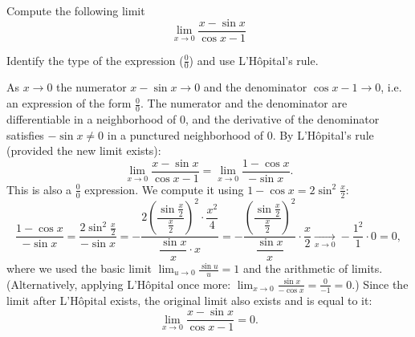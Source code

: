 
\begin{question}
Compute the following limit
\[ \lim_{x\to 0} \frac{x - \sin x}{\cos x - 1} \]
\end{question}

\begin{hint}
Identify the type of the expression ($\frac{0}{0}$) and use L'Hôpital's rule.
\end{hint}

\begin{solution}
As $x \to 0$ the numerator $x - \sin x \to 0$ and the denominator $\cos x - 1 \to 0$, i.e. an expression of the form $\frac{0}{0}$.
The numerator and the denominator are differentiable in a neighborhood of $0$, and the derivative of the denominator satisfies $-\sin x \ne 0$ in a punctured neighborhood of $0$. By L'Hôpital's rule (provided the new limit exists):
\[ \lim_{x\to 0} \frac{x - \sin x}{\cos x - 1} = \lim_{x\to 0} \frac{1 - \cos x}{-\sin x}. \]
This is also a $\frac{0}{0}$ expression. We compute it using $1 - \cos x = 2\sin^2\frac{x}{2}$:
\[ \frac{1 - \cos x}{-\sin x} = \frac{2\sin^2\frac{x}{2}}{-\sin x}
   = -\frac{2\left(\dfrac{\sin\frac{x}{2}}{\frac{x}{2}}\right)^2 \cdot \dfrac{x^2}{4}}{\dfrac{\sin x}{x} \cdot x}
   = -\frac{\left(\dfrac{\sin\frac{x}{2}}{\frac{x}{2}}\right)^2}{\dfrac{\sin x}{x}} \cdot \frac{x}{2}
   \xrightarrow[x\to 0]{} -\frac{1^2}{1}\cdot 0 = 0, \]
where we used the basic limit $\lim_{u\to 0}\frac{\sin u}{u} = 1$ and the arithmetic of limits.
(Alternatively, applying L'Hôpital once more: $\lim_{x\to0}\frac{\sin x}{-\cos x} = \frac{0}{-1} = 0$.)
Since the limit after L'Hôpital exists, the original limit also exists and is equal to it:
\[ \boxed{\lim_{x\to 0} \frac{x - \sin x}{\cos x - 1} = 0}. \]
\end{solution}
